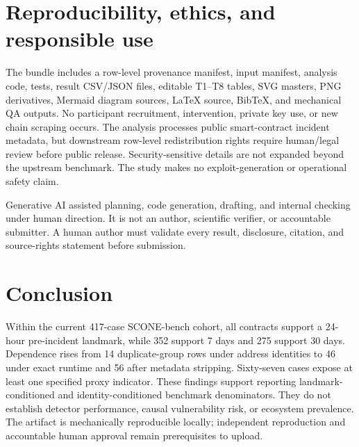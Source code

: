 \documentclass[10pt]{article}
\newcommand{\dataset}{SCONE-bench}
\begin{document}
\section{Reproducibility, ethics, and responsible use}
The bundle includes a row-level provenance manifest, input manifest, analysis code, tests, result CSV/JSON files, editable T1--T8 tables, SVG masters, PNG derivatives, Mermaid diagram sources, LaTeX source, BibTeX, and mechanical QA outputs. No participant recruitment, intervention, private key use, or new chain scraping occurs. The analysis processes public smart-contract incident metadata, but downstream row-level redistribution rights require human/legal review before public release. Security-sensitive details are not expanded beyond the upstream benchmark. The study makes no exploit-generation or operational safety claim.

Generative AI assisted planning, code generation, drafting, and internal checking under human direction. It is not an author, scientific verifier, or accountable submitter. A human author must validate every result, disclosure, citation, and source-rights statement before submission.

\section{Conclusion}
Within the current 417-case \dataset{} cohort, all contracts support a 24-hour pre-incident landmark, while 352 support 7 days and 275 support 30 days. Dependence rises from 14 duplicate-group rows under address identities to 46 under exact runtime and 56 after metadata stripping. Sixty-seven cases expose at least one specified proxy indicator. These findings support reporting landmark-conditioned and identity-conditioned benchmark denominators. They do not establish detector performance, causal vulnerability risk, or ecosystem prevalence. The artifact is mechanically reproducible locally; independent reproduction and accountable human approval remain prerequisites to upload.
\end{document}

